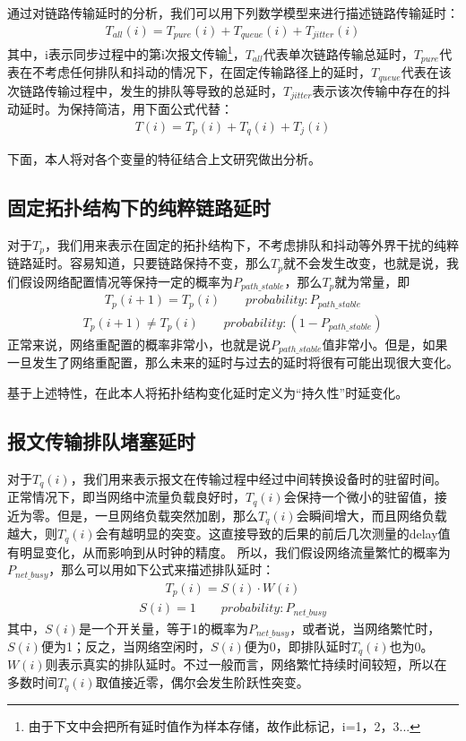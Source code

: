 通过对链路传输延时的分析，我们可以用下列数学模型来进行描述链路传输延时：
\begin {align}
T_{all}(i) = T_{pure}(i) + T_{queue}(i) + T_{jitter}(i)
\end{align}
其中，i表示同步过程中的第i次报文传输\footnote{由于下文中会把所有延时值作为样本存储，故作此标记，i=1，2，3...}，$T_{all}$代表单次链路传输总延时，$T_{pure}$代表在不考虑任何排队和抖动的情况下，在固定传输路径上的延时，$T_{queue}$代表在该次链路传输过程中，发生的排队等导致的总延时，$T_{jitter}$表示该次传输中存在的抖动延时。为保持简洁，用下面公式代替：
\begin {align}
T(i) = T_{p}(i) + T_{q}(i) + T_{j}(i)
\end{align}

下面，本人将对各个变量的特征结合上文研究做出分析。
\subsection{固定拓扑结构下的纯粹链路延时}
对于$T_{p}$，我们用来表示在固定的拓扑结构下，不考虑排队和抖动等外界干扰的纯粹链路延时。容易知道，只要链路保持不变，那么$T_{p}$就不会发生改变，也就是说，我们假设网络配置情况等保持一定的概率为$P_{path\_stable}$，那么$T_{p}$就为常量，即
\begin {align}
T_{p}(i+1) = T_{p}(i) \qquad probability: P_{path\_stable}
\end{align}
\begin {align}
T_{p}(i+1) \neq T_{p}(i) \qquad probability: (1-P_{path\_stable})
\end{align}
正常来说，网络重配置的概率非常小，也就是说$P_{path\_stable}$值非常小。但是，如果一旦发生了网络重配置，那么未来的延时与过去的延时将很有可能出现很大变化。

基于上述特性，在此本人将拓扑结构变化延时定义为“持久性”时延变化。

\subsection{报文传输排队堵塞延时}
对于$T_{q}(i)$，我们用来表示报文在传输过程中经过中间转换设备时的驻留时间。正常情况下，即当网络中流量负载良好时，$T_{q}(i)$会保持一个微小的驻留值，接近为零。但是，一旦网络负载突然加剧，那么$T_{q}(i)$会瞬间增大，而且网络负载越大，则$T_{q}(i)$会有越明显的突变。这直接导致的后果的前后几次测量的delay值有明显变化，从而影响到从时钟的精度。
所以，我们假设网络流量繁忙的概率为$P_{net\_busy}$，那么可以用如下公式来描述排队延时：
\begin {align}
T_{p}(i) = S(i) \cdot W(i) 
\end{align}
\begin {align}
S(i) = 1 \qquad probability: P_{net\_busy}
\end{align}
其中，$S(i)$是一个开关量，等于1的概率为$P_{net\_busy}$，或者说，当网络繁忙时，$S(i)$便为1；反之，当网络空闲时，$S(i)$便为0，即排队延时$T_{q}(i)$也为0。$W(i)$则表示真实的排队延时。不过一般而言，网络繁忙持续时间较短，所以在多数时间$T_{q}(i)$取值接近零，偶尔会发生阶跃性突变。

